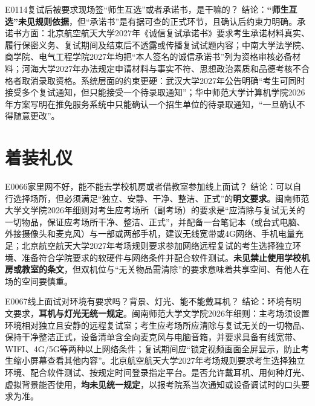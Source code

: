 \begin{qa}{E0114}{复试后被要求现场签“师生互选”或者承诺书，是干嘛的？}
结论：\textbf{“师生互选”未见规则依据}，但“承诺书”是有据可查的正式环节，且确认后约束力明确。承诺书方面：北京航空航天大学2027年《诚信复试承诺书》要求考生承诺材料真实、履行保密义务、复试期间及结束后不透露或传播复试试题内容；中南大学法学院、商学院、电气工程学院2027年均把“本人签名的诚信承诺书”列为资格审核必备材料；河海大学2027年办法规定申请材料与事实不符、思想政治素质和品德考核不合格者取消录取资格。系统层面的约束更硬：武汉大学2027年公告明确“考生可同时接受多个复试通知，但只能接受一个待录取通知”；华中师范大学计算机学院2026年方案写明在推免服务系统中只能确认一个招生单位的待录取通知，“一旦确认不得随意更改”。
\end{qa}

\section{着装礼仪}
\begin{qa}{E0066}{家里网不好，能不能去学校机房或者借教室参加线上面试？}
结论：可以自行选择场所，但必须满足“独立、安静、干净、整洁、正式”的\textbf{明文要求}。闽南师范大学文学院2026年细则对考生应考场所（副考场）的要求是“应清除与复试无关的一切物品，保证应考场所干净、整洁、正式”，并配备一台笔记本（或台式电脑、外接摄像头和麦克风）与一部或两部手机，建议无线宽带或4G网络、手机电量充足；北京航空航天大学2027年考场规则要求参加网络远程复试的考生选择独立环境、准备符合学院要求的软硬件与网络条件并配合软件测试。\textbf{未见禁止使用学校机房或教室的条文}，但双机位与“无关物品需清除”的要求意味着共享空间、有他人在场的空间要慎重。
\end{qa}

\begin{qa}{E0067}{线上面试对环境有要求吗？背景、灯光、能不能戴耳机？}
结论：环境有明文要求，\textbf{耳机与灯光无统一规定}。闽南师范大学文学院2026年细则：主考场须设置环境相对独立且安静的远程复试室；考生应考场所应清除与复试无关的一切物品、保持干净整洁正式，设备清单含全向麦克风与电脑音箱，并要求具备有线宽带、WIFI、4G/5G等两种以上网络条件；复试期间应“锁定视频画面全屏显示，防止考生缩小屏幕查看其他内容”。北京航空航天大学2027年考场规则要求考生选择独立环境、配合软件测试、按规定时间登录指定平台。是否允许戴耳机、用何种灯光、虚拟背景能否使用，\textbf{均未见统一规定}，以报考院系当次通知或设备调试时的口头要求为准。
\end{qa}

